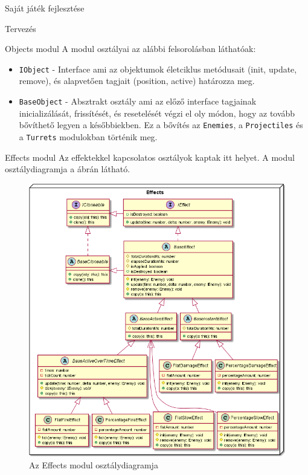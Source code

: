 \begin{MyChapter}{Saját játék fejlesztése}
\begin{MySection}{Tervezés}
\begin{MySubSection}{Objects modul}
			A modul osztályai az alábbi felsorolásban láthatóak:
			\begin{itemize}
				\item \texttt{IObject} - Interface ami az objektumok életciklus metódusait (init, update, remove), és alapvetően tagjait (position, active) határozza meg.
				
				\item \texttt{BaseObject} - Absztrakt osztály ami az előző interface tagjainak inicializálását, frissítését, és resetelését végzi el oly módon, hogy az tovább bővíthető legyen a későbbiekben. Ez a bővítés az \texttt{Enemies}, a \texttt{Projectiles} és a \texttt{Turrets} modulokban történik meg.
				
			\end{itemize}
		\end{MySubSection}
	
		\begin{MySubSection}{Effects modul}
			Az effektekkel kapcsolatos osztályok kaptak itt helyet.
			A modul osztálydiagramja a  ábrán látható.
			
			\begin{figure}[h!]
				\centering
				\includegraphics[width=1.1\textwidth]{kepek/uml/effects/effect.png}
				\caption{Az Effects modul osztálydiagramja}
				\label{fig:uml:effect}
			\end{figure}
			

\end{MySubSection}
\end{MySection}
\end{MyChapter}

